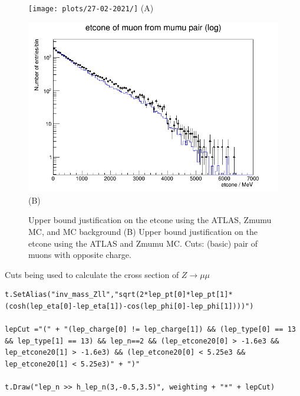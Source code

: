 \begin{figure}[h!]
    \centering
    \begin{minipage}{0.5\textwidth}
        \centering
        \texttt{[image: plots/27-02-2021/]}
        (A)
    \end{minipage}\hfill
    \begin{minipage}{0.5\textwidth}
        \centering
        \includegraphics[width=\linewidth]{plots/27-02-2021/2-Stack_Zmumu-etcone-upper-bound-justification_(basic)_14-59.png}
        (B)
    \end{minipage}
    \caption{Upper bound justification on the etcone using the ATLAS, Zmumu MC, and MC background (B) Upper bound justification on the etcone using the ATLAS and Zmumu MC.  Cuts: (basic) pair of muons with opposite charge.}
    \label{fig:Stack_Zmumu-etcone-lower-bound-justification(basic)_27-02-21_15-11}
\end{figure}

Cuts being used to calculate the cross section of $Z \rightarrow \mu\mu$
\begin{lstlisting}
t.SetAlias("inv_mass_Zll","sqrt(2*lep_pt[0]*lep_pt[1]*(cosh(lep_eta[0]-lep_eta[1])-cos(lep_phi[0]-lep_phi[1])))")
    
lepCut ="(" + "(lep_charge[0] != lep_charge[1]) && (lep_type[0] == 13 && lep_type[1] == 13) && lep_n==2 && (lep_etcone20[0] > -1.6e3 && lep_etcone20[1] > -1.6e3) && (lep_etcone20[0] < 5.25e3 && lep_etcone20[1] < 5.25e3)" + ")"    
  
t.Draw("lep_n >> h_lep_n(3,-0.5,3.5)", weighting + "*" + lepCut)
\end{lstlisting}

